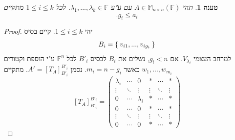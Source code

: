 \documentclass[12pt]{report}
\theoremstyle{plain}
\newtheorem{proposition}[theorem]{טענה}
\theoremstyle{definition}
\newcommand{\F}{\mathbb{F}}
\newcommand{\M}{\mathbb{M}}
\newcommand{\0}{\mathbf{0}}
\begin{document}
\begin{proposition}\label{prop:geo-alg}
תהי
$A\in\M_{n\times n}(\F)$
עם ע"ע
$\lambda_1,...,\lambda_k\in\F$.
לכל
$1\leq i\leq k$
מתקיים
$$
.g_i\leq a_i
$$
\end{proposition}

\begin{proof}
יהי
$1\leq i\leq k$.
קיים בסיס
$$
B_i=\Set{v_{i1},...,v_{ig_i}}
$$
למרחב העצמי 
$V_{\lambda_i}$.
אם 
$g_i<n$,
נשלים את 
$B_i$
לבסיס 
$B'_i$
לכל
$\F^n$
ע"י הוספת וקטורים
$w_1,...,w_{m_i}$
כאשר 
$m_i=n-g_i$.
נסמן
$A'=[T_A]_{B'_i}^{B'_i}$.
מתקיים
$$
[T_A]_{B'_i}^{B'_i}=\begin{pmatrix}
\lambda_i & \cdots & 0 & * & \cdots & * \\
\vdots & \ddots & \vdots & \vdots &\ddots & \vdots \\
0 & \cdots & \lambda_i & * & \cdots & * \\
0 & \cdots & 0 & * & \cdots & * \\
\vdots & \ddots & \vdots & \vdots &\ddots & \vdots \\
0 & \cdots & 0 & * & \cdots & *
\end{pmatrix}
$$


\end{proof}
\end{document}
